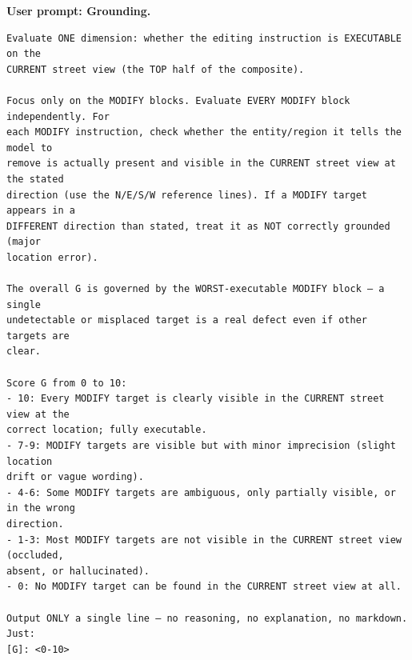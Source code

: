 \noindent\textbf{User prompt: Grounding.}\par
\begingroup\fontsize{8}{10}\selectfont
\begin{promptbox}
\begin{verbatim}
Evaluate ONE dimension: whether the editing instruction is EXECUTABLE on the
CURRENT street view (the TOP half of the composite).

Focus only on the MODIFY blocks. Evaluate EVERY MODIFY block independently. For
each MODIFY instruction, check whether the entity/region it tells the model to
remove is actually present and visible in the CURRENT street view at the stated
direction (use the N/E/S/W reference lines). If a MODIFY target appears in a
DIFFERENT direction than stated, treat it as NOT correctly grounded (major
location error).

The overall G is governed by the WORST-executable MODIFY block — a single
undetectable or misplaced target is a real defect even if other targets are
clear.

Score G from 0 to 10:
- 10: Every MODIFY target is clearly visible in the CURRENT street view at the
correct location; fully executable.
- 7-9: MODIFY targets are visible but with minor imprecision (slight location
drift or vague wording).
- 4-6: Some MODIFY targets are ambiguous, only partially visible, or in the wrong
direction.
- 1-3: Most MODIFY targets are not visible in the CURRENT street view (occluded,
absent, or hallucinated).
- 0: No MODIFY target can be found in the CURRENT street view at all.

Output ONLY a single line — no reasoning, no explanation, no markdown. Just:
[G]: <0-10>
\end{verbatim}
\end{promptbox}
\endgroup

